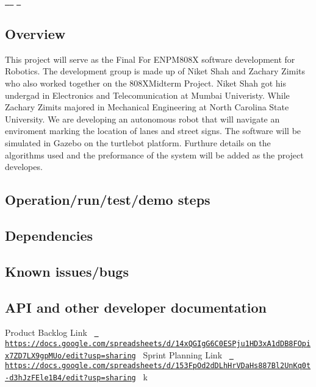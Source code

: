 \href{https://travis-ci.com/zzimits/808XFinal}\texttt{ } \href{https://coveralls.io/github/zzimits/808XFinal?branch=master}\texttt{ } \href{https://opensource.org/licenses/BSD-3-Clause}\texttt{ }

\subsection*{Overview}

This project will serve as the Final For E\+N\+P\+M808X software development for Robotics. The development group is made up of Niket Shah and Zachary Zimits who also worked together on the 808X\+Midterm Project. Niket Shah got his undergad in Electronics and Telecomunication at Mumbai Univeristy. While Zachary Zimits majored in Mechanical Engineering at North Carolina State University. We are developing an autonomous robot that will navigate an enviroment marking the location of lanes and street signs. The software will be simulated in Gazebo on the turtlebot platform. Furthure details on the algorithms used and the preformance of the system will be added as the project developes.

\subsection*{Operation/run/test/demo steps}

\subsection*{Dependencies}

\subsection*{Known issues/bugs}

\subsection*{A\+PI and other developer documentation}

Product Backlog Link~\newline
 \href{https://docs.google.com/spreadsheets/d/14xQGIgG6C0ESPju1HD3xA1dDB8FOpix7ZD7LX9gpMUo/edit?usp=sharing}\texttt{ https\+://docs.\+google.\+com/spreadsheets/d/14x\+Q\+G\+Ig\+G6\+C0\+E\+S\+Pju1\+H\+D3x\+A1d\+D\+B8\+F\+Opix7\+Z\+D7\+L\+X9gp\+M\+Uo/edit?usp=sharing}~\newline
 Sprint Planning Link~\newline
 \href{https://docs.google.com/spreadsheets/d/153FpOd2dDLhHrVDaHs887Bl2UnKq0t-d3hJzFEle1B4/edit?usp=sharing}\texttt{ https\+://docs.\+google.\+com/spreadsheets/d/153\+Fp\+Od2d\+D\+Lh\+Hr\+V\+Da\+Hs887\+Bl2\+Un\+Kq0t-\/d3h\+Jz\+F\+Ele1\+B4/edit?usp=sharing}~\newline
k 